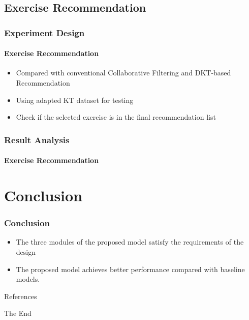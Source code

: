 \documentclass[10pt,aspectratio=43,mathserif]{beamer}
\begin{document}
\subsection{Exercise Recommendation}
\begin{frame}
	\frametitle{Experiment Design}
	\framesubtitle{Exercise Recommendation}
	\begin{itemize}
		\item Compared with conventional Collaborative Filtering and DKT-based Recommendation
		\item Using adapted KT dataset for testing
		\item Check if the selected exercise is in the final recommendation list
	\end{itemize}
\end{frame}


\begin{frame}
	\frametitle{Result Analysis}
	\framesubtitle{Exercise Recommendation}
	\begin{table}[htb]
		\caption{The performance comparison between baseline and proposed recommendation models.}\label{tbl:ch4-exp-result}
		\centering
	\end{table}
\end{frame}


\section{Conclusion}
\begin{frame}
	\frametitle{Conclusion}
	\begin{itemize}
		\item The three modules of the proposed model satisfy the requirements of the design
		\item The proposed model achieves better performance compared with baseline models.
	\end{itemize}
\end{frame}

\begin{frame}[allowframebreaks]{References}
	
	
\end{frame}


\begin{frame}
	\Huge{\centerline{The End}}
\end{frame}
\end{document}
